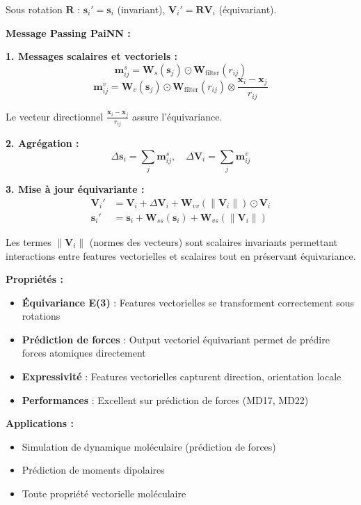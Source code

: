 Sous rotation $\mathbf{R}$ : $\mathbf{s}_i' = \mathbf{s}_i$ (invariant), $\mathbf{V}_i' = \mathbf{R} \mathbf{V}_i$ (équivariant).

\textbf{Message Passing PaiNN :}

\textbf{1. Messages scalaires et vectoriels :}
\[
\mathbf{m}_{ij}^s = \mathbf{W}_s(\mathbf{s}_j) \odot \mathbf{W}_{\text{filter}}(r_{ij})
\]
\[
\mathbf{m}_{ij}^v = \mathbf{W}_v(\mathbf{s}_j) \odot \mathbf{W}_{\text{filter}}(r_{ij}) \otimes \frac{\mathbf{x}_i - \mathbf{x}_j}{r_{ij}}
\]

Le vecteur directionnel $\frac{\mathbf{x}_i - \mathbf{x}_j}{r_{ij}}$ assure l'équivariance.

\textbf{2. Agrégation :}
\[
\Delta \mathbf{s}_i = \sum_{j} \mathbf{m}_{ij}^s, \quad \Delta \mathbf{V}_i = \sum_{j} \mathbf{m}_{ij}^v
\]

\textbf{3. Mise à jour équivariante :}
\begin{align*}
\mathbf{V}_i' &= \mathbf{V}_i + \Delta \mathbf{V}_i + \mathbf{W}_{vv}(\|\mathbf{V}_i\|) \odot \mathbf{V}_i \\
\mathbf{s}_i' &= \mathbf{s}_i + \mathbf{W}_{ss}(\mathbf{s}_i) + \mathbf{W}_{vs}(\|\mathbf{V}_i\|)
\end{align*}

Les termes $\|\mathbf{V}_i\|$ (normes des vecteurs) sont scalaires invariants permettant interactions entre features vectorielles et scalaires tout en préservant équivariance.

\textbf{Propriétés :}
\begin{itemize}
    \item \textbf{Équivariance E(3)} : Features vectorielles se transforment correctement sous rotations
    \item \textbf{Prédiction de forces} : Output vectoriel équivariant permet de prédire forces atomiques directement
    \item \textbf{Expressivité} : Features vectorielles capturent direction, orientation locale
    \item \textbf{Performances} : Excellent sur prédiction de forces (MD17, MD22)
\end{itemize}

\textbf{Applications :}
\begin{itemize}
    \item Simulation de dynamique moléculaire (prédiction de forces)
    \item Prédiction de moments dipolaires
    \item Toute propriété vectorielle moléculaire
\end{itemize}


